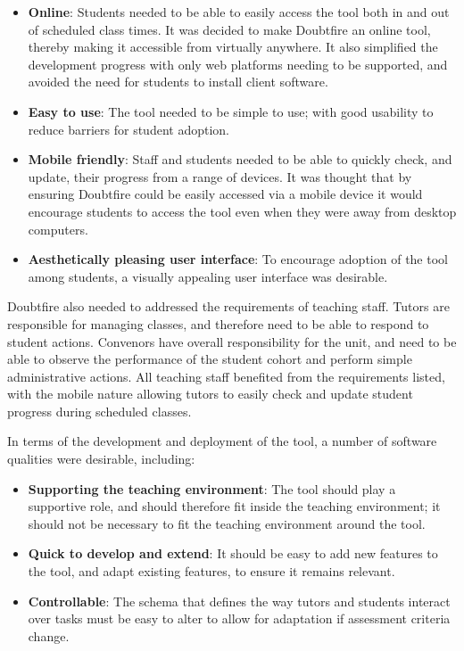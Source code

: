 \begin{itemize}[noitemsep,nolistsep]
  \item \textbf{Online}: Students needed to be able to easily access the tool both in and out of scheduled class times. It was decided to make Doubtfire an online tool, thereby making it accessible from virtually anywhere. It also simplified the development progress with only web platforms needing to be supported, and avoided the need for students to install client software.
  \item \textbf{Easy to use}: The tool needed to be simple to use; with good usability to reduce barriers for student adoption.
  \item \textbf{Mobile friendly}: Staff and students needed to be able to quickly check, and update, their progress from a range of devices. It was thought that by ensuring Doubtfire could be easily accessed via a mobile device it would encourage students to access the tool even when they were away from desktop computers. 
  \item \textbf{Aesthetically pleasing user interface}: To encourage adoption of the tool among students, a visually appealing user interface was desirable.
\end{itemize}

Doubtfire also needed to addressed the requirements of teaching staff. Tutors are responsible for managing classes, and therefore need to be able to respond to student actions. Convenors have overall responsibility for the unit, and need to be able to observe the performance of the student cohort and perform simple administrative actions. All teaching staff benefited from the requirements listed, with the mobile nature allowing tutors to easily check and update student progress during scheduled classes.

In terms of the development and deployment of the tool, a number of software qualities were desirable, including:
\begin{itemize}[noitemsep,nolistsep]
  \item \textbf{Supporting the teaching environment}: The tool should play a supportive role, and should therefore fit inside the teaching environment; it should not be necessary to fit the teaching environment around the tool.
  \item \textbf{Quick to develop and extend}: It should be easy to add new features to the tool, and adapt existing features, to ensure it remains relevant.
  \item \textbf{Controllable}: The schema that defines the way tutors and students interact over tasks must be easy to alter to allow for adaptation if assessment criteria change.
\end{itemize}

